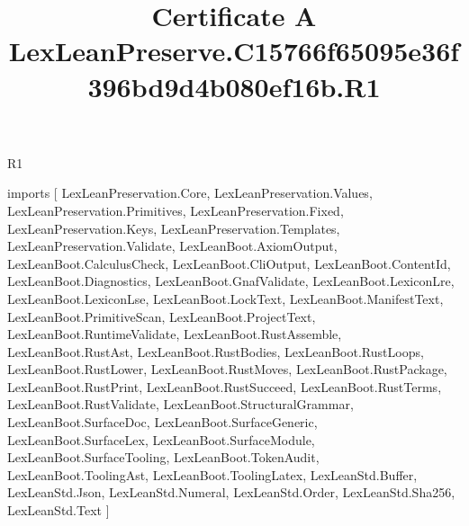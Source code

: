 \begin{lexlean}{R1}
\title{Certificate A LexLeanPreserve.C15766f65095e36f396bd9d4b080ef16b.R1}
\begin{coremodule}
imports [
  LexLeanPreservation.Core,
  LexLeanPreservation.Values,
  LexLeanPreservation.Primitives,
  LexLeanPreservation.Fixed,
  LexLeanPreservation.Keys,
  LexLeanPreservation.Templates,
  LexLeanPreservation.Validate,
  LexLeanBoot.AxiomOutput,
  LexLeanBoot.CalculusCheck,
  LexLeanBoot.CliOutput,
  LexLeanBoot.ContentId,
  LexLeanBoot.Diagnostics,
  LexLeanBoot.GnafValidate,
  LexLeanBoot.LexiconLre,
  LexLeanBoot.LexiconLse,
  LexLeanBoot.LockText,
  LexLeanBoot.ManifestText,
  LexLeanBoot.PrimitiveScan,
  LexLeanBoot.ProjectText,
  LexLeanBoot.RuntimeValidate,
  LexLeanBoot.RustAssemble,
  LexLeanBoot.RustAst,
  LexLeanBoot.RustBodies,
  LexLeanBoot.RustLoops,
  LexLeanBoot.RustLower,
  LexLeanBoot.RustMoves,
  LexLeanBoot.RustPackage,
  LexLeanBoot.RustPrint,
  LexLeanBoot.RustSucceed,
  LexLeanBoot.RustTerms,
  LexLeanBoot.RustValidate,
  LexLeanBoot.StructuralGrammar,
  LexLeanBoot.SurfaceDoc,
  LexLeanBoot.SurfaceGeneric,
  LexLeanBoot.SurfaceLex,
  LexLeanBoot.SurfaceModule,
  LexLeanBoot.SurfaceTooling,
  LexLeanBoot.TokenAudit,
  LexLeanBoot.ToolingAst,
  LexLeanBoot.ToolingLatex,
  LexLeanStd.Buffer,
  LexLeanStd.Json,
  LexLeanStd.Numeral,
  LexLeanStd.Order,
  LexLeanStd.Sha256,
  LexLeanStd.Text
]


\end{coremodule}
\end{lexlean}
